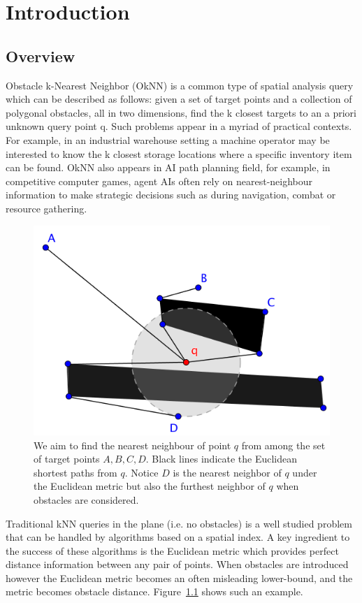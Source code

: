 \chapter{Introduction}
\section{Overview}
Obstacle k-Nearest Neighbor (OkNN) is a common type
of spatial analysis query which can be described as follows:
given a set of target points and a collection of polygonal obstacles,
all in two dimensions, find the k closest targets to
an a priori unknown query point q. Such problems appear
in a myriad of practical contexts. For example, in an industrial
warehouse setting a machine operator may be interested
to know the k closest storage locations where a specific inventory
item can be found. OkNN also appears in AI path planning field, for example,
in competitive computer games, agent AIs often rely on nearest-neighbour information
to make strategic decisions such as during navigation,
combat or resource gathering.

\begin{figure}[htp]
  \centering
  \includegraphics[width=.7\linewidth]{./pic/obs_dis.png}
  \caption{\small
  We aim to find the nearest neighbour of point $q$ from among the set of target points $A,B,C,D$.
  Black lines indicate the Euclidean shortest paths from $q$.
  Notice $D$ is the nearest neighbor of $q$ under the Euclidean metric
  but also the furthest neighbor of $q$ when obstacles are considered.}
\label{obs_dis}
\end{figure}

Traditional kNN queries in the plane (i.e. no obstacles) is a well studied problem that can be
handled by algorithms based on a spatial index. A key ingredient to the success of
these algorithms is the Euclidean metric which provides perfect distance information between
any pair of points. When obstacles are introduced however the Euclidean metric becomes an often
misleading lower-bound, and the metric becomes obstacle distance. Figure~\ref{obs_dis} shows such an example.

